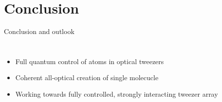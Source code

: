 \documentclass{beamer}
\begin{document}
\section{Conclusion}
\begin{frame}[t]{Conclusion and outlook}
  \vspace{-0.5cm}
  \begin{columns}
    \column{6cm}
    \begin{itemize}
    \item Full quantum control of atoms in optical tweezers
    \item<2-> Coherent all-optical creation of single molecucle
    \item<3-> Working towards fully controlled, strongly interacting tweezer array
    \end{itemize}
    \column{5.8cm}
\end{columns}
\end{frame}
\end{document}
